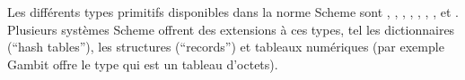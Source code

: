 

Les différents types primitifs disponibles dans la norme Scheme
sont , , ,
, , , ,
 et .
Plusieurs systèmes Scheme offrent des extensions à ces types, tel
les dictionnaires (``hash tables''), les structures (``records'') et tableaux numériques (par exemple Gambit
offre le type  qui est un tableau d'octets).

